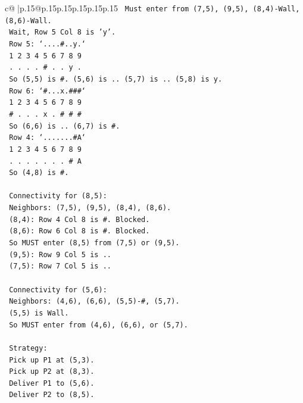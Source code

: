 \documentclass{article}
\begin{document}
{\begin{supertabular}{c@{$\;$}|p{.15\linewidth}@{}p{.15\linewidth}p{.15\linewidth}p{.15\linewidth}p{.15\linewidth}p{.15\linewidth}}
{{{\texttt{   Must enter from (7,5), (9,5), (8,4){-}Wall, (8,6){-}Wall.} \\
\texttt{   Wait, Row 5 Col 8 is 'y'.} \\
\texttt{   Row 5: `....\#..y.`} \\
\texttt{   1 2 3 4 5 6 7 8 9} \\
\texttt{   . . . . \# . . y .} \\
\texttt{   So (5,5) is \#. (5,6) is .. (5,7) is .. (5,8) is y.} \\
\texttt{   Row 6: `\#...x.\#\#\#`} \\
\texttt{   1 2 3 4 5 6 7 8 9} \\
\texttt{   \# . . . x . \# \# \#} \\
\texttt{   So (6,6) is .. (6,7) is \#.} \\
\texttt{   Row 4: `.......\#A`} \\
\texttt{   1 2 3 4 5 6 7 8 9} \\
\texttt{   . . . . . . . \# A} \\
\texttt{   So (4,8) is \#.} \\
\\ 
\texttt{   Connectivity for (8,5):} \\
\texttt{   Neighbors: (7,5), (9,5), (8,4), (8,6).} \\
\texttt{   (8,4): Row 4 Col 8 is \#. Blocked.} \\
\texttt{   (8,6): Row 6 Col 8 is \#. Blocked.} \\
\texttt{   So MUST enter (8,5) from (7,5) or (9,5).} \\
\texttt{   (9,5): Row 9 Col 5 is ..} \\
\texttt{   (7,5): Row 7 Col 5 is ..} \\
\\ 
\texttt{   Connectivity for (5,6):} \\
\texttt{   Neighbors: (4,6), (6,6), (5,5){-}\#, (5,7).} \\
\texttt{   (5,5) is Wall.} \\
\texttt{   So MUST enter from (4,6), (6,6), or (5,7).} \\
\\ 
\texttt{   Strategy:} \\
\texttt{   Pick up P1 at (5,3).} \\
\texttt{   Pick up P2 at (8,3).} \\
\texttt{   Deliver P1 to (5,6).} \\
\texttt{   Deliver P2 to (8,5).} \\
\\ 
}}}
\end{supertabular}}
\end{document}
